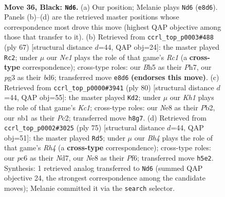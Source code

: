 \documentclass[11pt]{article}
\begin{document}
\clearpage

\begin{figure}[p]\centering
\begin{subfigure}{0.46\textwidth}\centering
\resizebox{\linewidth}{!}{%
\newchessgame
\chessboard[
  setfen={1r2n2k/2p2p1p/p1P5/P4p1b/4pK2/6P1/8/RNB5 b - - 3 36},
  showmover=false,
  pgfstyle=straightmove, color=movearrow, markmove={e8-d6}
]}
\caption{}
\end{subfigure}\hfill
\begin{subfigure}{0.46\textwidth}\centering
\resizebox{\linewidth}{!}{%
\newchessgame
\chessboard[
  setfen={2r5/5kpp/3Bpp2/6P1/b3p3/1p2P2P/5P1N/1R2K3 b - - 3 34},
  showmover=false,
  pgfstyle=straightmove, color=movearrow, markmove={c8-c2}
]}
\caption{}
\end{subfigure}
\\[4pt]
\begin{subfigure}{0.46\textwidth}\centering
\resizebox{\linewidth}{!}{%
\newchessgame
\chessboard[
  setfen={3r4/6pp/4p3/pB2Pk2/3pbP1P/P7/1PP2R2/2K5 w - - 3 41},
  showmover=false,
  pgfstyle=straightmove, color=movearrow, markmove={c1-d2}
]}
\caption{}
\end{subfigure}\hfill
\begin{subfigure}{0.46\textwidth}\centering
\resizebox{\linewidth}{!}{%
\newchessgame
\chessboard[
  setfen={3k4/3n4/1p1P1pNp/7r/PP4p1/5pK1/5P2/1R6 b - - 1 38},
  showmover=false,
  pgfstyle=straightmove, color=movearrow, markmove={h5-d5}
]}
\caption{}
\end{subfigure}
\caption{\textbf{Move 36, Black: \texttt{Nd6}.} (a) Our position; Melanie plays \texttt{Nd6} (\texttt{e8d6}). Panels (b)--(d) are the retrieved master positions whose correspondence most drove this move (highest QAP objective among those that transfer to it). (b) Retrieved from \texttt{ccrl\_top\_p0003\#488} (ply 67) [structural distance $d$=44, QAP obj=24]: the master played \texttt{Rc2}; under $\mu$ our \emph{Ne1} plays the role of that game's \emph{Rc1} (a \textbf{cross-type} correspondence); cross-type roles: our \emph{B}h5 as their \emph{P}h7, our \emph{p}g3 as their \emph{b}d6; transferred move \texttt{e8d6} \textbf{(endorses this move)}. (c) Retrieved from \texttt{ccrl\_top\_p0000\#3941} (ply 80) [structural distance $d$=44, QAP obj=55]: the master played \texttt{Kd2}; under $\mu$ our \emph{Kh1} plays the role of that game's \emph{Kc1}; cross-type roles: our \emph{N}e8 as their \emph{P}b2, our \emph{n}b1 as their \emph{P}c2; transferred move \texttt{h8g7}. (d) Retrieved from \texttt{ccrl\_top\_p0002\#3025} (ply 75) [structural distance $d$=44, QAP obj=51]: the master played \texttt{Rd5}; under $\mu$ our \emph{Bh4} plays the role of that game's \emph{Rh4} (a \textbf{cross-type} correspondence); cross-type roles: our \emph{p}c6 as their \emph{N}d7, our \emph{N}e8 as their \emph{P}f6; transferred move \texttt{h5e2}. Synthesis: 1 retrieved analog transferred to \texttt{Nd6} (summed QAP objective 24, the strongest correspondence among the candidate moves); Melanie committed it via the \texttt{search} selector.}
\label{fig:thought-m71}
\end{figure}
\end{document}
